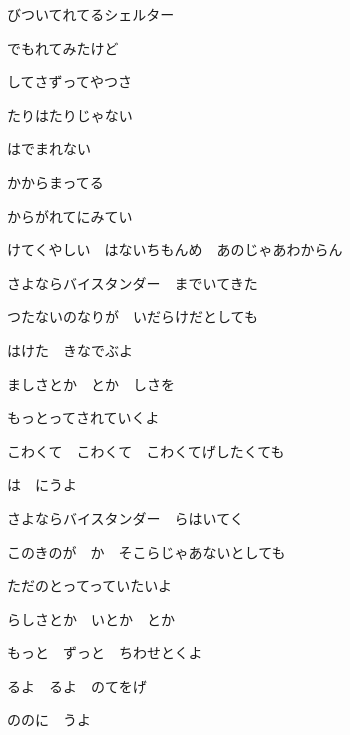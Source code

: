 \documentclass[14pt]{extreport}
\begin{document}
{\item
  びついてれてるシェルター
  \trans{}

  でもれてみたけど
  \trans{}

  してさずってやつさ
  \trans{}

  たりはたりじゃない
  \trans{}

  はでまれない
  \trans{}

  かからまってる
  \trans{}

  からがれてにみてい
  \trans{}

  けてくやしい　はないちもんめ　あのじゃあわからん
  \trans{}


\item
  さよならバイスタンダー　までいてきた
  \trans{}

  つたないのなりが　いだらけだとしても

  はけた　きなでぶよ
  \trans{}

  ましさとか　とか　しさを
  \trans{}

  もっとってされていくよ
  \trans{}

  こわくて　こわくて　こわくてげしたくても
  \trans{}

  は　にうよ
  \trans{}


\item
  さよならバイスタンダー　らはいてく
  \trans{}

  このきのが　か　そこらじゃあないとしても
  \trans{}

  ただのとってっていたいよ
  \trans{}

  らしさとか　いとか　とか
  \trans{}

  もっと　ずっと　ちわせとくよ
  \trans{}

  るよ　るよ　のてをげ
  \trans{}

  ののに　うよ
  \trans{}

}
\end{document}
